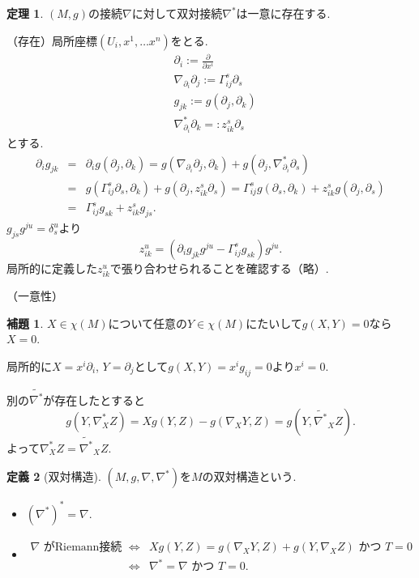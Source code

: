 \documentclass{jsarticle}
\newcommand{\con}{\nabla}
\newcommand{\dcon}{\con^{*}}
\newcommand{\cris}[3]{\Gamma_{#1 #2}^{#3}}
\newcommand{\marud}[1]{\partial_{#1}}
\theoremstyle{definition}
\newtheorem{theorem}{定理}
\newtheorem{lemma}{補題}
\newtheorem{definition}[theorem]{定義}
\numberwithin{theorem}{section}
\begin{document}
\begin{theorem}
$(M,g)$の接続$\con$に対して双対接続$\dcon$は一意に存在する.
\end{theorem}

（存在）局所座標$(U_i,x^1, \dots x^n)$をとる.
\begin{eqnarray*}
& \marud{i}:=\frac{\partial}{\partial x^i}\\
& \con_{\marud{i}}\marud{j}:=\cris{i}{j}{s}\marud{s}\\
& g_{jk}:=g(\marud{j},\marud{k})\\
& \dcon_{\marud{i}}\marud{k}=:z^s_{ik}\marud{s}
\end{eqnarray*}
とする.
\begin{eqnarray*}
\marud{i}g_{jk}&=&\marud{i} g(\marud{j},\marud{k}) = g(\con_{\marud{i}}\marud{j},\marud{k})+g(\marud{j},\dcon_{\marud{i}} \marud{s})\\
&=&g(\cris{i}{j}{s}\marud{s},\marud{k})+g(\marud{j},z^s_{ik}\marud{s})=\cris{i}{j}{s}g(\marud{s},\marud{k})+z^s_{ik}g(\marud{j},\marud{s})\\
&=&\cris{i}{j}{s}g_{sk}+z^s_{ik}g_{js}.
\end{eqnarray*}
$g_{js}g^{ju}=\delta_{s}^u$より
\[
z^u_{ik}=(\marud{i}g_{jk}g^{ju}-\cris{i}{j}{s}g_{sk})g^{ju}.
\]
局所的に定義した$z^u_{ik}$で張り合わせられることを確認する（略）.

（一意性）
\begin{lemma}
$X \in \chi(M)$について任意の$Y\in\chi(M)$にたいして$g(X,Y)=0$なら$X=0$.
\end{lemma}
局所的に$X=x^i \marud{i}$, $Y=\marud{j}$として$g(X,Y)=x^i g_{ij}=0$より$x^i=0$.

別の$\tilde{\dcon}$が存在したとすると
\[
g(Y,\dcon_X Z)=Xg(Y,Z)-g(\con_X Y,Z)=g(Y,\tilde{\dcon}_X Z).
\]
よって$\dcon_X Z = \tilde{\dcon}_X Z$.

\begin{definition}[双対構造]
$(M,g,\con,\dcon)$を$M$の双対構造という.
\end{definition}
\begin{itemize}
\item $(\dcon)^{*}=\con$.
\item
\begin{eqnarray*}
\con\text{ がRiemann接続 } &\iff& Xg(Y,Z)=g(\con_X Y,Z)+g(Y,\con_X Z) \text{ かつ }T=0\\
&\iff& \dcon = \con \text{ かつ }T=0.
\end{eqnarray*}
\end{itemize}
\end{document}

